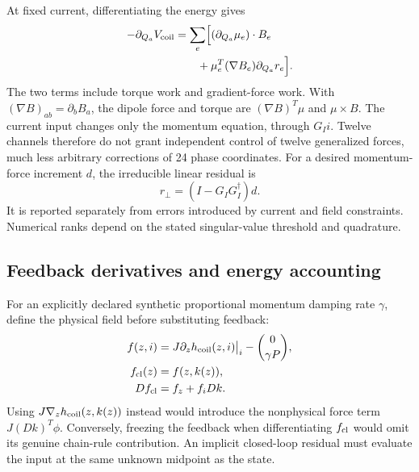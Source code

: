 At fixed current, differentiating the energy gives
\begin{equation}
\begin{aligned}
 -\partial_{Q_a}V_{\rm coil}
 &=\sum_e\Bigl[(\partial_{Q_a}\mu_e)\cdot B_e\\
 &\qquad+\mu_e^T(\nabla B_e)\partial_{Q_a}r_e\Bigr].
\end{aligned}
 \label{eq:magnetic-virtual-work}
\end{equation}
The two terms include torque work and gradient-force work. With $(\nabla B)_{ab}=\partial_b B_a$, the dipole force and torque are $(\nabla B)^T\mu$ and $\mu\times B$. The current input changes only the momentum equation, through $G_Ii$. Twelve channels therefore do not grant independent control of twelve generalized forces, much less arbitrary corrections of 24 phase coordinates. For a desired momentum-force increment $d$, the irreducible linear residual is
\begin{equation}
 r_\perp=(I-G_IG_I^\dagger)d.
 \label{eq:unreachable-force}
\end{equation}
It is reported separately from errors introduced by current and field constraints. Numerical ranks depend on the stated singular-value threshold and quadrature.

\subsection{Feedback derivatives and energy accounting}
For an explicitly declared synthetic proportional momentum damping rate $\gamma$, define the physical field before substituting feedback:
\begin{equation}
\begin{aligned}
 f(z,i)&=J\partial_z h_{\rm coil}(z,i)\big|_i-
 \binom{0}{\gamma P},\\
 f_{\rm cl}(z)&=f(z,k(z)),\\
 Df_{\rm cl}&=f_z+f_iDk.
\end{aligned}
 \label{eq:physical-feedback}
\end{equation}
Using $J\nabla_z h_{\rm coil}(z,k(z))$ instead would introduce the nonphysical force term $J(Dk)^T\phi$. Conversely, freezing the feedback when differentiating $f_{\rm cl}$ would omit its genuine chain-rule contribution. An implicit closed-loop residual must evaluate the input at the same unknown midpoint as the state.

